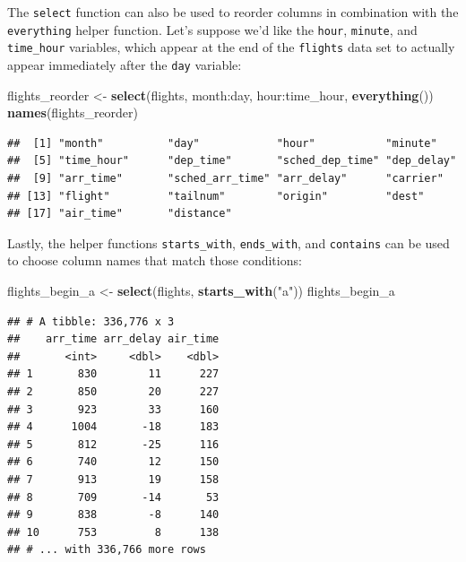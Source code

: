 \documentclass[]{tufte-book}
\newenvironment{Shaded}{\begin{snugshade}}{\end{snugshade}}
\newcommand{\KeywordTok}[1]{\textcolor[rgb]{0.13,0.29,0.53}{\textbf{{#1}}}}
\newcommand{\StringTok}[1]{\textcolor[rgb]{0.31,0.60,0.02}{{#1}}}
\newcommand{\NormalTok}[1]{{#1}}
\begin{document}
The \texttt{select} function can also be used to reorder columns in
combination with the \texttt{everything} helper function. Let's suppose
we'd like the \texttt{hour}, \texttt{minute}, and \texttt{time\_hour}
variables, which appear at the end of the \texttt{flights} data set to
actually appear immediately after the \texttt{day} variable:

\begin{Shaded}
\begin{Highlighting}[]
\NormalTok{flights_reorder <-}\StringTok{ }\KeywordTok{select}\NormalTok{(flights, month:day, hour:time_hour, }\KeywordTok{everything}\NormalTok{())}
\KeywordTok{names}\NormalTok{(flights_reorder)}
\end{Highlighting}
\end{Shaded}

\begin{verbatim}
##  [1] "month"          "day"            "hour"           "minute"        
##  [5] "time_hour"      "dep_time"       "sched_dep_time" "dep_delay"     
##  [9] "arr_time"       "sched_arr_time" "arr_delay"      "carrier"       
## [13] "flight"         "tailnum"        "origin"         "dest"          
## [17] "air_time"       "distance"
\end{verbatim}

Lastly, the helper functions \texttt{starts\_with}, \texttt{ends\_with},
and \texttt{contains} can be used to choose column names that match
those conditions:

\begin{Shaded}
\begin{Highlighting}[]
\NormalTok{flights_begin_a <-}\StringTok{ }\KeywordTok{select}\NormalTok{(flights, }\KeywordTok{starts_with}\NormalTok{(}\StringTok{"a"}\NormalTok{))}
\NormalTok{flights_begin_a}
\end{Highlighting}
\end{Shaded}

\begin{verbatim}
## # A tibble: 336,776 x 3
##    arr_time arr_delay air_time
##       <int>     <dbl>    <dbl>
## 1       830        11      227
## 2       850        20      227
## 3       923        33      160
## 4      1004       -18      183
## 5       812       -25      116
## 6       740        12      150
## 7       913        19      158
## 8       709       -14       53
## 9       838        -8      140
## 10      753         8      138
## # ... with 336,766 more rows
\end{verbatim}
\end{document}
